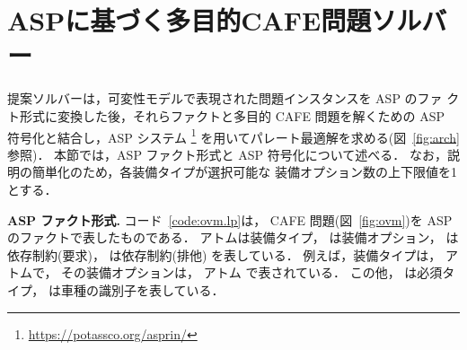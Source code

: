 \section{ASPに基づく多目的CAFE問題ソルバー}\label{sec:proposal}

 

 

提案ソルバーは，可変性モデルで表現された問題インスタンスを ASP のファ
クト形式に変換した後，それらファクトと多目的 CAFE 問題を解くための ASP
符号化と結合し，ASP システム
{\asprin}\footnote{\url{https://potassco.org/asprin/}}
を用いてパレート最適解を求める(図~\ref{fig:arch}参照)．
本節では，ASP ファクト形式と ASP 符号化について述べる．
なお，説明の簡単化のため，各装備タイプが選択可能な
装備オプション数の上下限値を1とする．

\textbf{ASP ファクト形式.}
コード~\ref{code:ovm.lp}は，
CAFE 問題(図~\ref{fig:ovm})を ASP のファクトで表したものである．
%
アトムは装備タイプ，
は装備オプション，
は依存制約(要求)，
は依存制約(排他)
を表している．
例えば，装備タイプは，
アトムで，
その装備オプションは，
アトム
で表されている．
この他，
は必須タイプ，
は車種の識別子を表している．

